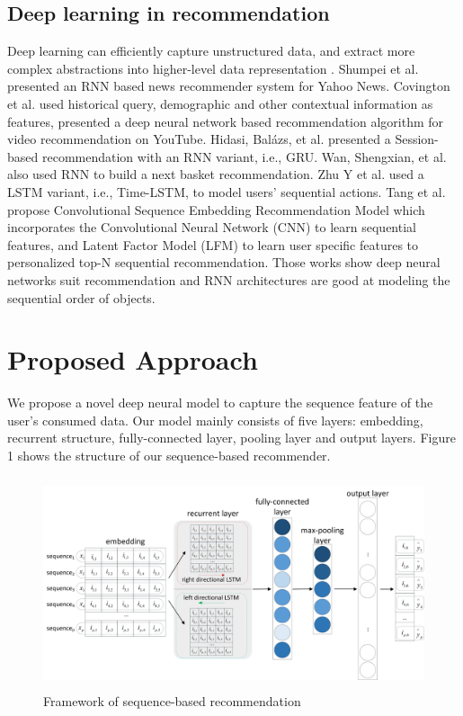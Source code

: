 \documentclass[runningheads]{llncs}
\begin{document}
\subsection{Deep learning in recommendation}
Deep learning can efficiently capture unstructured data, and extract more complex abstractions into higher-level data representation \cite{Zhang2017DeepLB}.  Shumpei et al. \cite{okura2017embedding} presented an RNN based news recommender system for Yahoo News. Covington et al. \cite{covington2016deep} used historical query, demographic and other contextual information as features, presented a deep neural network based recommendation algorithm for video recommendation on YouTube. Hidasi, Balázs, et al. \cite{Hidasi2015Session} presented a Session-based recommendation with an RNN variant, i.e., GRU. Wan, Shengxian, et al. \cite{Wan2015NextBR} also used RNN to build a next basket recommendation. Zhu Y et al. \cite{ijcai2017-504} used a LSTM variant, i.e., Time-LSTM, to model users’ sequential actions. Tang et al. \cite{Tang:2018:PTS:3159652.3159656} propose Convolutional Sequence Embedding Recommendation Model which incorporates the Convolutional Neural Network (CNN) to learn sequential features, and Latent Factor Model (LFM) to learn user specific features to personalized top-N sequential recommendation. Those works show deep neural networks suit recommendation and RNN architectures are good at modeling the sequential order of objects.

\section{Proposed Approach}

We propose a novel deep neural model to capture the sequence feature of the user's consumed data. Our model mainly consists of five layers: embedding, recurrent structure, fully-connected layer, pooling layer and output layers. Figure 1 shows the structure of our sequence-based recommender.
\begin{figure}[htbp]
\centerline
{\includegraphics[height=6.2cm,width=\linewidth]{image/structer.png}}
\caption{Framework of sequence-based recommendation }
\end{figure}
\end{document}
